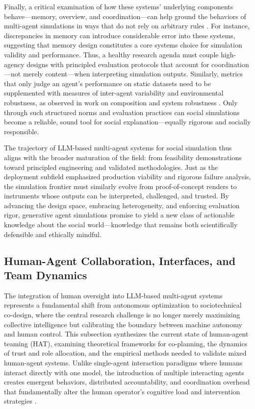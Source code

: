 \documentclass[11pt,a4paper]{article}
\begin{document}
Finally, a critical examination of how these systems' underlying components behave---memory, overview, and coordination---can help ground the behaviors of multi-agent simulations in ways that do not rely on arbitrary rules \cite{arxiv:2602.04296v1}. For instance, discrepancies in memory can introduce considerable error into these systems, suggesting that memory design constitutes a core systems choice for simulation validity and performance. Thus, a healthy research agenda must couple high-agency designs with principled evaluation protocols that account for coordination---not merely content---when interpreting simulation outputs. Similarly, metrics that only judge an agent's performance on static datasets need to be supplemented with measures of inter-agent variability and environmental robustness, as observed in work on composition and system robustness \cite{arxiv:2507.22925v1}. Only through such structured norms and evaluation practices can social simulations become a reliable, sound tool for social explanation---equally rigorous and socially responsible.

The trajectory of LLM-based multi-agent systems for social simulation thus aligns with the broader maturation of the field: from feasibility demonstrations toward principled engineering and validated methodologies. Just as the deployment subfield emphasized production viability and rigorous failure analysis, the simulation frontier must similarly evolve from proof-of-concept renders to instruments whose outputs can be interpreted, challenged, and trusted. By advancing the design space, embracing heterogeneity, and enforcing evaluation rigor, generative agent simulations promise to yield a new class of actionable knowledge about the social world---knowledge that remains both scientifically defensible and ethically mindful.


\subsection{Human-Agent Collaboration, Interfaces, and Team Dynamics}


The integration of human oversight into LLM-based multi-agent systems represents a fundamental shift from autonomous optimization to sociotechnical co-design, where the central research challenge is no longer merely maximizing collective intelligence but calibrating the boundary between machine autonomy and human control. This subsection synthesizes the current state of human-agent teaming (HAT), examining theoretical frameworks for co-planning, the dynamics of trust and role allocation, and the empirical methods needed to validate mixed human-agent systems. Unlike single-agent interaction paradigms where humans interact directly with one model, the introduction of multiple interacting agents creates emergent behaviors, distributed accountability, and coordination overhead that fundamentally alter the human operator's cognitive load and intervention strategies \cite{arxiv:2505.00753v5}.
\end{document}
